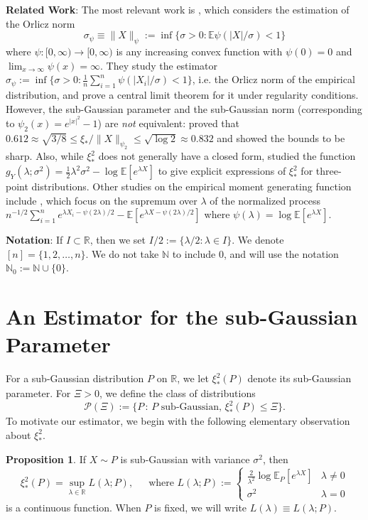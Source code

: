 \documentclass{article}
\theoremstyle{definition}
\newtheorem{proposition}{Proposition}
\newcommand{\R}{\mathbb{R}}
\newcommand{\N}{\mathbb{N}}
\newcommand{\E}{\mathbb{E}}
\newcommand{\1}{\mathbbm{1}}
\begin{document}
\noindent \textbf{Related Work}: The most relevant work is \cite{mies2026empiricalorlicznorms}, which considers the estimation of the Orlicz norm 
\[
\sigma_\psi \equiv \|X\|_{\psi} := \inf \{\sigma > 0: \E \psi(|X|/\sigma) < 1\}
\]
where $\psi: [0, \infty) \to [0, \infty)$ is any increasing convex function with $\psi(0) = 0$ and $\lim_{x \to \infty} \psi(x) = \infty$. 
They study the estimator $\hat \sigma_\psi := \inf \{\sigma > 0: \frac1n\sum_{i=1}^n\psi(|X_i|/\sigma) < 1\}$, i.e. the Orlicz norm of the empirical distribution, and prove a central limit theorem for it under regularity conditions. However, the sub-Gaussian parameter and the sub-Gaussian norm (corresponding to $\psi_2(x) = e^{|x|^2} - 1$) are \textit{not} equivalent: \cite{leskel2026sharp} proved that $0.612\approx \sqrt{3/8} \leq \xi_*/\|X\|_{\psi_2} \leq \sqrt{\log 2} \approx 0.832$ and showed the bounds to be sharp. Also, while $\xi_*^2$ does not generally have a closed form, \cite{atouani2025optimalsubgaussianvarianceproxy} studied the function $g_Y(\lambda; \sigma^2) = \frac12\lambda^2\sigma^2 - \log \E[e^{\lambda X}]$ to give explicit expressions of $\xi_*^2$ for three-point distributions. Other studies on the empirical moment generating function include \cite{Stewart2003-cd}, which focus on the supremum over $\lambda$ of the normalized process $n^{-1/2}\sum_{i=1}^n e^{\lambda X_i - \psi(2\lambda)/2} - \mathbb E[e^{\lambda X - \psi(2\lambda)/2}]$ where $\psi(\lambda) = \log \E[e^{\lambda X}]$.

\noindent \textbf{Notation}: If $I \subset \R$, then we set $I/2 := \{\lambda/2: \lambda \in I\}$. We denote $[n] = \{1,2,\dots,n\}$. We do not take $\N$ to include $0$, and will use the notation $\N_0 := \N \cup \{0\}$. 

\section{An Estimator for the sub-Gaussian Parameter}

For a sub-Gaussian distribution $P$ on $\mathbb{R}$, we let $\xi^2_*(P)$ denote its sub-Gaussian parameter. For $\Xi > 0$, we define the class of distributions
\[
 \mathcal{P}(\Xi) := \{ P \,:\, P \text{ sub-Gaussian}, \, \xi_*^2(P) \leq \Xi \}.
\]
To motivate our estimator, we begin with the following elementary observation about $\xi_*^2$. 
\begin{proposition}
\label{prop:xi-L-char}
    If $X \sim P$ is sub-Gaussian with variance $\sigma^2$, then 
    \[
    \xi_*^2(P) = \sup_{\lambda \in \R} L(\lambda ; P),\, \quad \text{ where } 
    L(\lambda; P) := \begin{cases}
        \frac{2}{\lambda^{2}} \log \E_P [e^{\lambda X}] & \lambda \ne 0 \\
        \sigma^2 & \lambda = 0
    \end{cases}
    \]
    is a continuous function. When $P$ is fixed, we will write $L(\lambda) \equiv L(\lambda; P)$.
\end{proposition}
\end{document}
